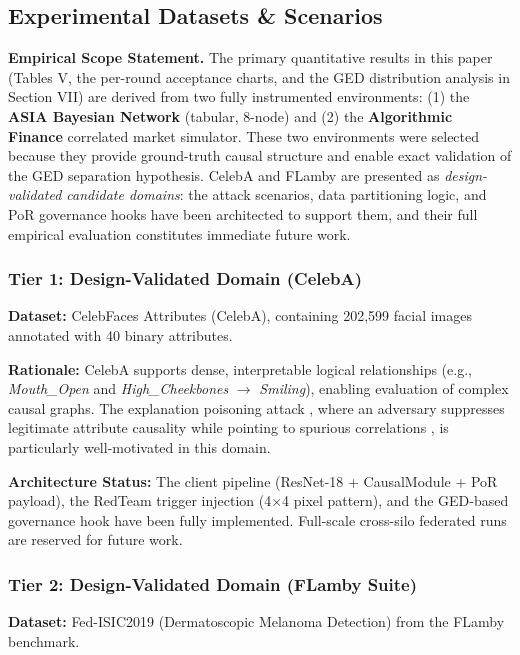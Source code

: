 \documentclass[journal]{IEEEtran}
\begin{document}
\subsection{Experimental Datasets \& Scenarios}

\textbf{Empirical Scope Statement.} The primary quantitative results in this paper (Tables V, the per-round acceptance charts, and the GED distribution analysis in Section VII) are derived from two fully instrumented environments: (1) the \textbf{ASIA Bayesian Network} (tabular, 8-node) and (2) the \textbf{Algorithmic Finance} correlated market simulator. These two environments were selected because they provide ground-truth causal structure and enable exact validation of the GED separation hypothesis. CelebA and FLamby are presented as \emph{design-validated candidate domains}: the attack scenarios, data partitioning logic, and PoR governance hooks have been architected to support them, and their full empirical evaluation constitutes immediate future work.

\subsubsection{Tier 1: Design-Validated Domain (CelebA)}

\textbf{Dataset:} CelebFaces Attributes (CelebA), containing 202,599 facial images annotated with 40 binary attributes.

\textbf{Rationale:} CelebA supports dense, interpretable logical relationships (e.g., \textit{Mouth\_Open} and \textit{High\_Cheekbones} $\rightarrow$ \textit{Smiling}), enabling evaluation of complex causal graphs. The explanation poisoning attack , where an adversary suppresses legitimate attribute causality while pointing to spurious correlations , is particularly well-motivated in this domain.

\textbf{Architecture Status:} The client pipeline (ResNet-18 + CausalModule + PoR payload), the RedTeam trigger injection (4$\times$4 pixel pattern), and the GED-based governance hook have been fully implemented. Full-scale cross-silo federated runs are reserved for future work.

\subsubsection{Tier 2: Design-Validated Domain (FLamby Suite)}

\textbf{Dataset:} Fed-ISIC2019 (Dermatoscopic Melanoma Detection) from the FLamby benchmark.
\end{document}
